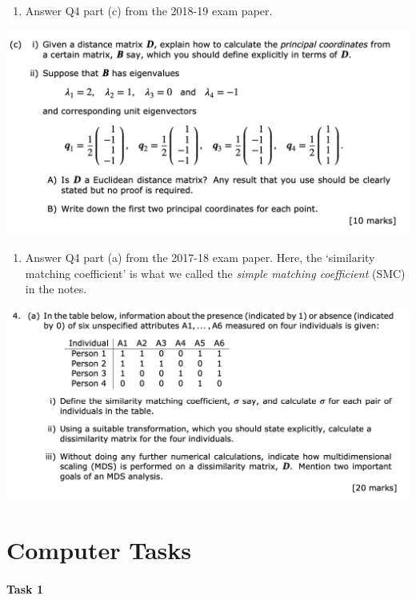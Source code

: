 \documentclass[
]{book}
\providecommand{\tightlist}{%
  \setlength{\itemsep}{0pt}\setlength{\parskip}{0pt}}
\theoremstyle{definition}
\theoremstyle{definition}
\theoremstyle{definition}
\theoremstyle{definition}
\theoremstyle{remark}
\begin{document}
\begin{enumerate}
\def\labelenumi{\arabic{enumi}.}
\setcounter{enumi}{3}
\tightlist
\item
  Answer Q4 part (c) from the 2018-19 exam paper.
\end{enumerate}

\includegraphics{figs/MDS_2018_19_Q4.png}

\begin{enumerate}
\def\labelenumi{\arabic{enumi}.}
\setcounter{enumi}{4}
\tightlist
\item
  Answer Q4 part (a) from the 2017-18 exam paper. Here, the `similarity matching coefficient' is what we called the \emph{simple matching coefficient} (SMC) in the notes.
\end{enumerate}

\includegraphics{figs/MDS_2017_18_Q4.png}

\section{Computer Tasks}\label{computer-tasks-2}

\paragraph*{Task 1}\label{task-1-1}
\end{document}
